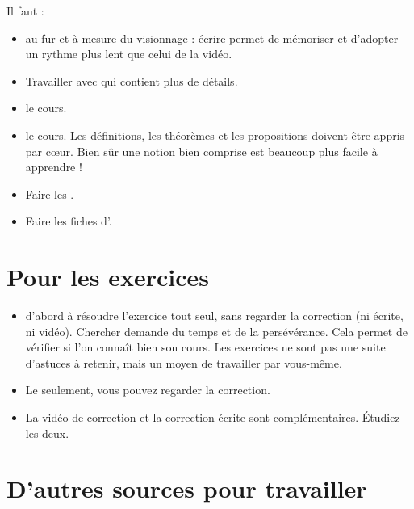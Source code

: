Il faut :
\begin{itemize}
  \item {} au fur et à mesure du visionnage : écrire permet de mémoriser et d'adopter un rythme plus lent
que celui de la vidéo.

  \item Travailler avec  qui contient plus de détails.

  \item {} le cours.

  \item {} le cours. Les définitions, les théorèmes et les propositions doivent être appris par c\oe ur.
Bien sûr une notion bien comprise est beaucoup plus facile à apprendre !

  \item Faire les .

  \item Faire les fiches d'.
\end{itemize}

\section{Pour les exercices}


\begin{itemize}
  \item {} d'abord à résoudre l'exercice tout seul, sans regarder la correction (ni écrite, ni vidéo).
Chercher demande du temps et de la persévérance. Cela permet de vérifier si l'on connaît bien son cours.
Les exercices ne sont pas une suite d'astuces à retenir, mais un moyen de travailler par vous-même. 

  \item Le  seulement, vous pouvez regarder la correction.

  \item La vidéo de correction et la correction écrite sont complémentaires. \'Etudiez les deux.
\end{itemize}



\section{D'autres sources pour travailler}

